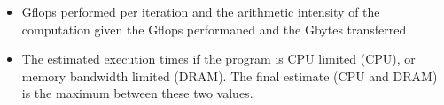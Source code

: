 \begin{itemize}
\item Gflops performed per iteration and the arithmetic intensity of
      the computation given the Gflops performaned and the Gbytes
      transferred

\item The estimated execution times if the program is CPU limited (CPU),
      or memory bandwidth limited (DRAM).  The final estimate (CPU and
      DRAM) is the maximum between these two values.

\end{itemize}


